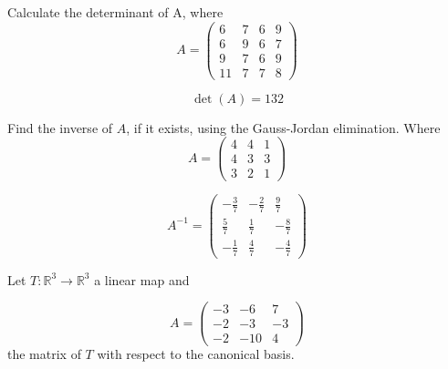 \begin{questions}

\question Calculate the determinant of A, where
$$
A=\left(\begin{array}{rrrr}
6 & 7 & 6 & 9 \\
6 & 9 & 6 & 7 \\
9 & 7 & 6 & 9 \\
11 & 7 & 7 & 8
\end{array}\right)
$$

\begin{solution}
$$\det(A)=132$$
\end{solution}

\question Find the inverse of $A$, if it exists, using the Gauss-Jordan elimination. Where
$$
A=\left(\begin{array}{rrr}
4 & 4 & 1 \\
4 & 3 & 3 \\
3 & 2 & 1
\end{array}\right)
$$

\begin{solution}
$$A^{-1}=\left(\begin{array}{rrr}
-\frac{3}{7} & -\frac{2}{7} & \frac{9}{7} \\
\frac{5}{7} & \frac{1}{7} & -\frac{8}{7} \\
-\frac{1}{7} & \frac{4}{7} & -\frac{4}{7}
\end{array}\right)$$
\end{solution}

\question Let $T:\mathbb{R}^3\rightarrow\mathbb{R}^3$  a linear map and
 
$$
A=\left(\begin{array}{rrr}
-3 & -6 & 7 \\
-2 & -3 & -3 \\
-2 & -10 & 4
\end{array}\right)
$$
the matrix of $T$ with respect to the canonical basis.
\end{questions}
